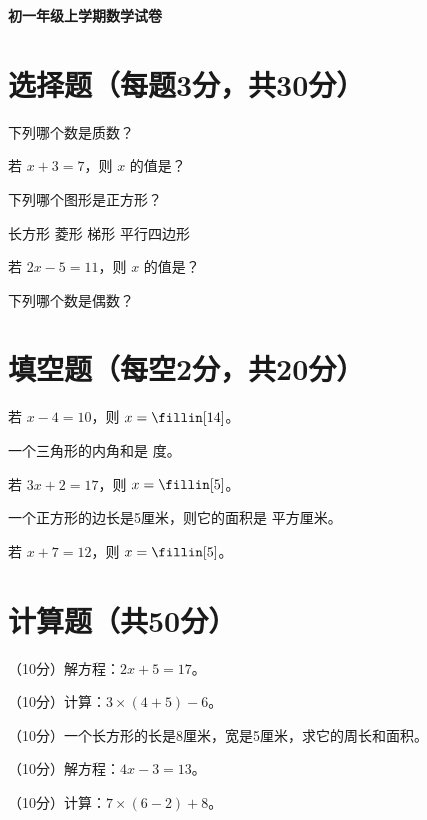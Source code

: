 \documentclass[14pt]{exam}
\begin{document}
\begin{center}
\textbf{\Large 初一年级上学期数学试卷}
\end{center}

\section*{选择题（每题3分，共30分）}

\begin{questions}

\question 下列哪个数是质数？
\begin{oneparchoices}
   
\end{oneparchoices}

\question 若 $x + 3 = 7$，则 $x$ 的值是？
\begin{oneparchoices}
   
\end{oneparchoices}

\question 下列哪个图形是正方形？
\begin{oneparchoices}
\choice 长方形 \choice 菱形 \choice 梯形 \choice 平行四边形
\end{oneparchoices}

\question 若 $2x - 5 = 11$，则 $x$ 的值是？
\begin{oneparchoices}
   
\end{oneparchoices}

\question 下列哪个数是偶数？
\begin{oneparchoices}
   
\end{oneparchoices}

\end{questions}

\section*{填空题（每空2分，共20分）}

\begin{questions}

\question 若 $x - 4 = 10$，则 $x = \fillin[14]$。

\question 一个三角形的内角和是 \fillin[180] 度。

\question 若 $3x + 2 = 17$，则 $x = \fillin[5]$。

\question 一个正方形的边长是5厘米，则它的面积是 \fillin[25] 平方厘米。

\question 若 $x + 7 = 12$，则 $x = \fillin[5]$。

\end{questions}

\section*{计算题（共50分）}

\begin{questions}

\question （10分）解方程：$2x + 5 = 17$。

\question （10分）计算：$3 \times (4 + 5) - 6$。

\question （10分）一个长方形的长是8厘米，宽是5厘米，求它的周长和面积。

\question （10分）解方程：$4x - 3 = 13$。

\question （10分）计算：$7 \times (6 - 2) + 8$。

\end{questions}
\end{document}

